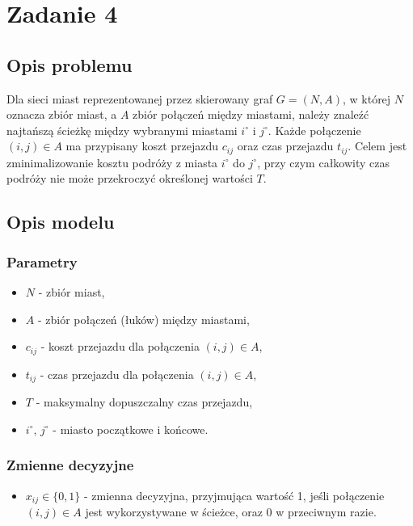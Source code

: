 \documentclass{article}
\begin{document}
\section{Zadanie 4}
\subsection{Opis problemu}
Dla sieci miast reprezentowanej przez skierowany graf $G = (N, A)$, w której $N$ oznacza zbiór miast, a $A$ zbiór połączeń między miastami, należy znaleźć najtańszą ścieżkę między wybranymi miastami $i^\circ$ i $j^\circ$. Każde połączenie $(i, j) \in A$ ma przypisany koszt przejazdu $c_{ij}$ oraz czas przejazdu $t_{ij}$. Celem jest zminimalizowanie kosztu podróży z miasta $i^\circ$ do $j^\circ$, przy czym całkowity czas podróży nie może przekroczyć określonej wartości $T$.

\subsection{Opis modelu}
\subsubsection{Parametry}
\begin{itemize}
    \item $N$ - zbiór miast,
    \item $A$ - zbiór połączeń (łuków) między miastami,
    \item $c_{ij}$ - koszt przejazdu dla połączenia $(i, j) \in A$,
    \item $t_{ij}$ - czas przejazdu dla połączenia $(i, j) \in A$,
    \item $T$ - maksymalny dopuszczalny czas przejazdu,
    \item $i^\circ$, $j^\circ$ - miasto początkowe i końcowe.
\end{itemize}

\subsubsection{Zmienne decyzyjne}
\begin{itemize}
    \item $x_{ij} \in \{0, 1\}$ - zmienna decyzyjna, przyjmująca wartość 1, jeśli połączenie $(i, j) \in A$ jest wykorzystywane w ścieżce, oraz 0 w przeciwnym razie.
\end{itemize}
\end{document}
